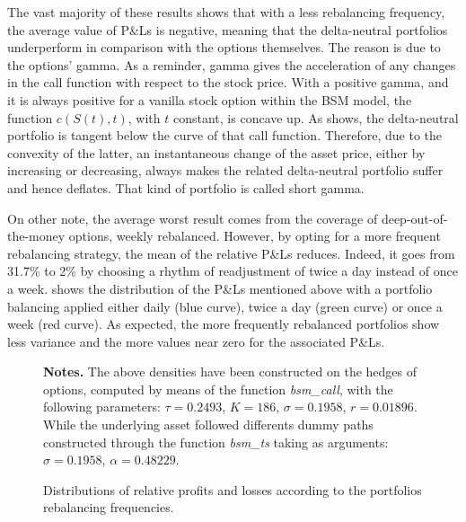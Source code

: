 \documentclass[12pt,a4paper]{report}
\begin{document}
The vast majority of these results shows that with a less rebalancing frequency, the average value of P\&Ls is negative, meaning that the delta-neutral portfolios underperform in comparison with the options themselves. 
The reason is due to the options' gamma. 
As a reminder, gamma gives the acceleration of any changes in the call function with respect to the stock price.
With a positive gamma, and it is always positive for a vanilla stock option within the BSM model, the function $c(S(t), t)$, with $t$  constant, is concave up. 
As \citet{shreve} shows, the delta-neutral portfolio is tangent below the curve of that call function.
Therefore, due to the convexity of the latter, an instantaneous change of the asset price, either by increasing or decreasing, always makes the related delta-neutral portfolio suffer and hence deflates. 
That kind of portfolio is called short gamma.

















On other note, the average worst result comes from the coverage of deep-out-of-the-money options, weekly rebalanced.
However, by opting for a more frequent rebalancing strategy, the mean of the relative P\&Ls reduces.  
Indeed, it goes from 31.7\% to 2\% by choosing a rhythm of readjustment of twice a day instead of once a week.
 shows the distribution of the P\&Ls mentioned above with a portfolio balancing applied either daily (blue curve), twice a day (green curve) or once a week (red curve).
As expected, the more frequently rebalanced portfolios show less variance and the more values near zero for the associated P\&Ls.

\begin{figure}[h]
  \centering
  
  \caption{Distributions of relative profits and losses according to the portfolios rebalancing frequencies.}
  \begin{changemargin}{0.5cm}{0.5cm}
  \medskip
\footnotesize
{}\textbf{Notes.} The above densities have been constructed on the hedges of options, computed by means of the function \textit{bsm\_call}, with the following parameters: $\tau = 0.2493$, $K = 186$, $\sigma = 0.1958$, $r = 0.01896$. While the underlying asset followed differents dummy paths constructed through the function \textit{bsm\_ts} taking as arguments: $\sigma = 0.1958$, $\alpha = 0.48229$.
  \end{changemargin}
  \label{p:analysis:gbm:pl:better}
\end{figure}
\end{document}
